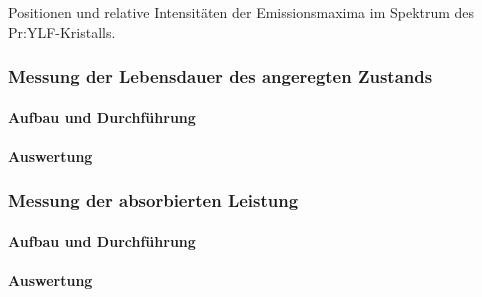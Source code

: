 \begin{table}[htb]
\caption{Positionen und relative Intensitäten der Emissionsmaxima im Spektrum des
Pr:YLF-Kristalls.}

\label{tab:EmSpec}
\end{table}


\FloatBarrier


\subsubsection{Messung der Lebensdauer des angeregten Zustands}

\paragraph{Aufbau und Durchführung}

\paragraph{Auswertung}



\subsubsection{Messung der absorbierten Leistung}

\paragraph{Aufbau und Durchführung}

\paragraph{Auswertung}

